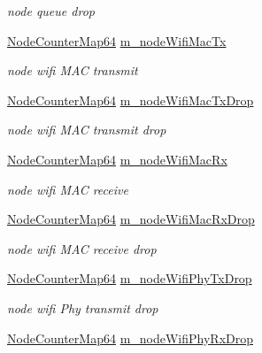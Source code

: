 \begin{DoxyCompactItemize}
\begin{DoxyCompactList}\small\item\em node queue drop \end{DoxyCompactList}\item 
\hyperlink{classns3_1_1AnimationInterface_a8bd3daf0ee1a2bbebced596061bd012b}{Node\+Counter\+Map64} \hyperlink{classns3_1_1AnimationInterface_a48e8647392a102a86f337d54f7e6031e}{m\+\_\+node\+Wifi\+Mac\+Tx}
\begin{DoxyCompactList}\small\item\em node wifi M\+AC transmit \end{DoxyCompactList}\item 
\hyperlink{classns3_1_1AnimationInterface_a8bd3daf0ee1a2bbebced596061bd012b}{Node\+Counter\+Map64} \hyperlink{classns3_1_1AnimationInterface_aaf173ba8b87a48153b5f3c80393ed107}{m\+\_\+node\+Wifi\+Mac\+Tx\+Drop}
\begin{DoxyCompactList}\small\item\em node wifi M\+AC transmit drop \end{DoxyCompactList}\item 
\hyperlink{classns3_1_1AnimationInterface_a8bd3daf0ee1a2bbebced596061bd012b}{Node\+Counter\+Map64} \hyperlink{classns3_1_1AnimationInterface_a778c27d71d6ecdc14f8ed8fa84e61af4}{m\+\_\+node\+Wifi\+Mac\+Rx}
\begin{DoxyCompactList}\small\item\em node wifi M\+AC receive \end{DoxyCompactList}\item 
\hyperlink{classns3_1_1AnimationInterface_a8bd3daf0ee1a2bbebced596061bd012b}{Node\+Counter\+Map64} \hyperlink{classns3_1_1AnimationInterface_a85015fd52de552c0d12e65b717760705}{m\+\_\+node\+Wifi\+Mac\+Rx\+Drop}
\begin{DoxyCompactList}\small\item\em node wifi M\+AC receive drop \end{DoxyCompactList}\item 
\hyperlink{classns3_1_1AnimationInterface_a8bd3daf0ee1a2bbebced596061bd012b}{Node\+Counter\+Map64} \hyperlink{classns3_1_1AnimationInterface_a457aa384a66bcc19e876e7aeab68f5be}{m\+\_\+node\+Wifi\+Phy\+Tx\+Drop}
\begin{DoxyCompactList}\small\item\em node wifi Phy transmit drop \end{DoxyCompactList}\item 
\hyperlink{classns3_1_1AnimationInterface_a8bd3daf0ee1a2bbebced596061bd012b}{Node\+Counter\+Map64} \hyperlink{classns3_1_1AnimationInterface_abaefa0f6b461eda045540a7f88744405}{m\+\_\+node\+Wifi\+Phy\+Rx\+Drop}

\end{DoxyCompactItemize}
